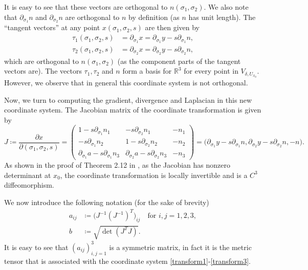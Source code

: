 \documentclass[12pt,a4paper]{article}
\theoremstyle{definition}
\theoremstyle{remark}
\numberwithin{equation}{section}
\begin{document}
It is easy to see that these vectors are orthogonal to $n (\sigma_1, \sigma_2)$. 
We also note that $\partial_{\sigma_1} n$ and $\partial_{\sigma_2} n$ are orthogonal to $n$ by definition (as $n$ has unit length). The ``tangent vectors'' at any point $x(\sigma_1, \sigma_2, s)$ are then given by
\begin{align*}
\tau_1 (\sigma_1, \sigma_2, s) &= \partial_{\sigma_1} x = \partial_{\sigma_1} y - s \partial_{\sigma_1} n, \\
\tau_2 (\sigma_1, \sigma_2, s) &= \partial_{\sigma_2} x = \partial_{\sigma_2} y - s \partial_{\sigma_2} n,
\end{align*}
which are orthogonal to $n(\sigma_1,\sigma_2)$ (as the component parts of the tangent vectors are). The vectors $\tau_1, \tau_2$ and $n$ form a basis for $\mathbb{R}^3$ for every point in $V_{\delta, U_{x_0}}$. However, we observe that in general this coordinate system is not orthogonal. 

Now, we turn to computing the gradient, divergence and Laplacian in this new coordinate system. The Jacobian matrix of the coordinate transformation is given by
\begin{equation} \label{jacobian}
J \coloneqq \frac{\partial x}{\partial (\sigma_1, \sigma_2, s)} = \begin{pmatrix}
1 - s \partial_{\sigma_1} n_1 & - s \partial_{\sigma_2} n_1 & - n_1 \\
- s \partial_{\sigma_1} n_2 & 1 - s \partial_{\sigma_2} n_2 & - n_2 \\
\partial_{\sigma_1} a - s \partial_{\sigma_1} n_3 & \partial_{\sigma_2} a - s \partial_{\sigma_2} n_3 & - n_3
\end{pmatrix} = \big(
\partial_{\sigma_1} y - s \partial_{\sigma_1} n, \partial_{\sigma_2} y - s \partial_{\sigma_2} n, - n \big).
\end{equation}
As shown in the proof of Theorem 2.12 in \cite{wloka}, as the Jacobian has nonzero determinant at $x_0$, the coordinate transformation is locally invertible and is a $C^3$ diffeomorphism.

We now introduce the following notation (for the sake of brevity)
\begin{align}
a_{ij} &\coloneqq \big(J^{-1} (J^{-1})^T \big)_{ij} \quad \text{for } i,j = 1, 2, 3, \label{aijdefinition} \\
b &\coloneqq \sqrt{\det ( J^T J)}.
\end{align}
It is easy to see that $(a_{ij})_{i,j=1}^3$ is a symmetric matrix, in fact it is the metric tensor that is associated with the coordinate system \eqref{transform1}-\eqref{transform3}. 
\end{document}
